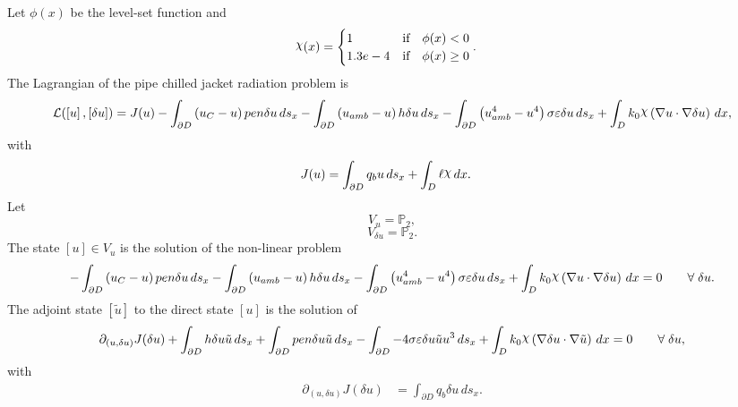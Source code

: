 \documentclass[preview]{standalone}
\let\oldcdot\cdot
\let\cdot\oldcdot
\begin{document}
Let $\phi(x)$ be the level-set function and
 \begin{align*}\raisebox{\depth}{$\chi$}(x) &= \begin{cases} 1 & \mbox{if}\quad \phi(x) < 0 \\ 1.3e-4 & \mbox{if}\quad \phi(x)  \ge 0 \end{cases}.\end{align*}
The Lagrangian of the pipe chilled jacket radiation problem is
\begin{dmath*}
\mathcal L(\left[ u\right],\left[ \delta u\right]) = J(u) -  \int_{\partial D} \left(u_{C} - u\right) pen \delta u \,ds_x -  \int_{\partial D} \left(u_{amb} - u\right) h \delta u \,ds_x -  \int_{\partial D} \left(u_{amb}^{4} - u^{4}\right) \sigma \varepsilon \delta u \,ds_x +  \int_{D} k_{0} \raisebox{\depth}{$\chi$} \left(  \nabla u  \cdot  \nabla \delta u  \right) \,dx , 
\end{dmath*}
with 
\begin{align*}
J(u) &=  \int_{\partial D} q_{b} u \,ds_x +  \int_{D} \ell \raisebox{\depth}{$\chi$} \,dx.
 \end{align*}
Let
\begin{equation*}
V_{u} = \mathbb P_{2},\end{equation*}
\begin{equation*}
V_{\delta u} = \mathbb P_{2}.\end{equation*}
The state $\left[ u\right] \in  V_{u}$ is the solution of the non-linear problem
\begin{dmath*}
-  \int_{\partial D} \left(u_{C} - u\right) pen \delta u \,ds_x -  \int_{\partial D} \left(u_{amb} - u\right) h \delta u \,ds_x -  \int_{\partial D} \left(u_{amb}^{4} - u^{4}\right) \sigma \varepsilon \delta u \,ds_x +  \int_{D} k_{0} \raisebox{\depth}{$\chi$} \left(  \nabla u  \cdot  \nabla \delta u  \right) \,dx = 0\qquad \forall\; \delta u . 
\end{dmath*}
The adjoint state $\left[ \tilde u\right]$ to the direct state $\left[ u\right]$ is the solution of
\begin{dmath*}
\partial_{(u,\delta u)} J(\delta u) +  \int_{\partial D} h \delta u \tilde u \,ds_x +  \int_{\partial D} pen \delta u \tilde u \,ds_x -  \int_{\partial D} - 4 \sigma \varepsilon \delta u \tilde u u^{3} \,ds_x +  \int_{D} k_{0} \raisebox{\depth}{$\chi$} \left(  \nabla \delta u  \cdot  \nabla \tilde u  \right) \,dx = 0\qquad \forall\; \delta u , 
\end{dmath*}
with 
\begin{align*}
\partial_{(u,\delta u)} J(\delta u) &=  \int_{\partial D} q_{b} \delta u \,ds_x.
 \end{align*}
\end{document}
